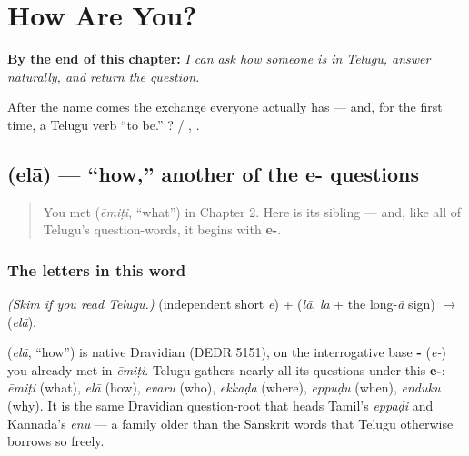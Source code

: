 
\chapter{How Are You?}
\label{ch:responding}

\begin{chapteropening}
\textbf{By the end of this chapter:} \emph{I can ask how someone is in Telugu, answer naturally, and return the question.}

After the name comes the exchange everyone actually has — and, for the first time, a Telugu verb “to be.”   ? /  , .
\end{chapteropening}

\section[\texorpdfstring{\te{ఎలా} (elā)}{ఎలా (elā)}]{ (elā) — \textquotedblleft{}how,\textquotedblright{} another of the e- questions}

\label{lesson:TE-C03-elaa}



\begin{quote}
You met \textbf{} (\emph{ēmiṭi}, \textquotedblleft{}what\textquotedblright{}) in Chapter 2. Here is its sibling — and, like all of Telugu's question-words, it begins with \textbf{e-}.
\end{quote}

\subsection*{The letters in this word}
\emph{(Skim if you read Telugu.)} \textbf{} (independent short \emph{e}) + \textbf{} (\emph{lā}, \emph{la} + the long-\emph{ā} sign) $\to$ \textbf{} (\emph{elā}).

\begin{cousinweb}
\textbf{} (\emph{elā}, \textquotedblleft{}how\textquotedblright{}) is native Dravidian (DEDR 5151), on the interrogative base \textbf{-} (\emph{e-}) you already met in \emph{ēmiṭi}. Telugu gathers nearly all its questions under this \textbf{e-}: \emph{ēmiṭi} (what), \emph{elā} (how), \emph{evaru} (who), \emph{ekkaḍa} (where), \emph{eppuḍu} (when), \emph{enduku} (why). It is the same Dravidian question-root that heads Tamil's \emph{eppaḍi} and Kannada's \emph{ēnu} — a family older than the Sanskrit words that Telugu otherwise borrows so freely.
\end{cousinweb}

